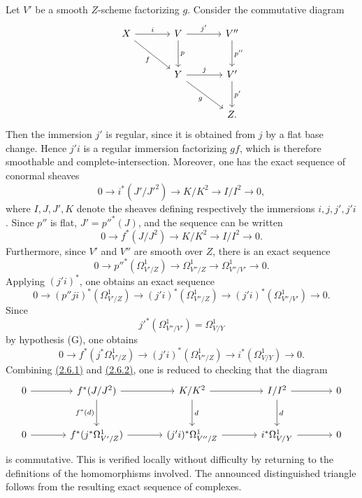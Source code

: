 Let $V'$ be a smooth $Z$-scheme factorizing $g$. Consider the commutative diagram
\[
\begin{tikzcd}[column sep=large,row sep=large]
X \arrow[r,"i"] \arrow[dr,"f"'] & V \arrow[r,"j'"] \arrow[d,"p"] & V'' \arrow[d,"p''"]\\
& Y \arrow[r,"j"] \arrow[dr,"g"'] & V' \arrow[d,"p'"]\\
& & Z .
\end{tikzcd}
\]
Then the immersion $j'$ is regular, since it is obtained from $j$ by a flat base change. Hence $j'i$ is a regular immersion factorizing $gf$, which is therefore smoothable and complete-intersection. Moreover, one has the exact sequence of conormal sheaves
\[
0\longrightarrow i^*(J'/J'^2)\longrightarrow K/K^2\longrightarrow I/I^2\longrightarrow0,
\]
where $I,J,J',K$ denote the sheaves defining respectively the immersions $i,j,j',j'i$. Since $p''$ is flat, $J'=p''^*(J)$, and the sequence can be written
\begin{equation}\tag{2.6.1}
0\longrightarrow f^*(J/J^2)\longrightarrow K/K^2\longrightarrow I/I^2\longrightarrow0.
\end{equation}
Furthermore, since $V'$ and $V''$ are smooth over $Z$, there is an exact sequence
\[
0\longrightarrow p''^*(\Omega^1_{V'/Z})\longrightarrow\Omega^1_{V''/Z}\longrightarrow\Omega^1_{V''/V'}\longrightarrow0.
\]
Applying $(j'i)^*$, one obtains an exact sequence
\[
0\longrightarrow (p''ji)^*(\Omega^1_{V'/Z})\longrightarrow (j'i)^*(\Omega^1_{V''/Z})\longrightarrow (j'i)^*(\Omega^1_{V''/V'})\longrightarrow0.
\]
Since
\[
j'^*(\Omega^1_{V''/V'})=\Omega^1_{V/Y}
\]
by hypothesis (G), one obtains
\begin{equation}\tag{2.6.2}
0\longrightarrow f^*(j^*\Omega^1_{V'/Z})\longrightarrow (j'i)^*(\Omega^1_{V''/Z})\longrightarrow i^*(\Omega^1_{V/Y})\longrightarrow0.
\end{equation}
Combining \hyperlink{sga6.e08.eq.2-6-1}{(2.6.1)} and \hyperlink{sga6.e08.eq.2-6-2}{(2.6.2)}, one is reduced to checking that the diagram
\[
\begin{tikzcd}[column sep=large,row sep=large]
0 \arrow[r] & f^*(J/J^2) \arrow[r] \arrow[d,"f^*(d)"'] & K/K^2 \arrow[r] \arrow[d,"d"] & I/I^2 \arrow[r] \arrow[d,"d"] & 0\\
0 \arrow[r] & f^*(j^*\Omega^1_{V'/Z}) \arrow[r] & (j'i)^*\Omega^1_{V''/Z} \arrow[r] & i^*\Omega^1_{V/Y} \arrow[r] & 0
\end{tikzcd}
\]
is commutative. This is verified locally without difficulty by returning to the definitions of the homomorphisms involved. The announced distinguished triangle follows from the resulting exact sequence of complexes.

